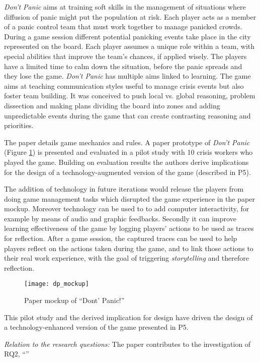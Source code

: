 \emph{Don't Panic} aims at training soft skills in the management of situations where diffusion of panic might put the population at risk. Each player acts as a member of a panic control team that must work together to manage panicked crowds. During a game session different potential panicking events take place in the city represented on the board. Each player assumes a unique role within a team, with special abilities that improve the team's chances, if applied wisely. The players have a limited time to calm down the situation, before the panic spreads and they lose the game. \emph{Don't Panic} has multiple aims linked to learning. The game aims at teaching communication styles useful to manage crisis events but also foster team building. It was conceived to push local vs. global reasoning, problem dissection and making plans dividing the board into zones and adding unpredictable events during the game that can create contrasting reasoning and priorities.

The paper details game mechanics and rules. A paper prototype of \emph{Don't Panic} (Figure \ref{fig:dp-mockup}) is presented and evaluated in a pilot study with 10 crisis workers who played the game. Building on evaluation results the authors derive implications for the design of a technology-augmented version of the game (described in P5).

The addition of technology in future iterations would release the players from doing game management tasks which disrupted the game experience in the paper mockup. Moreover technology can be used to to add computer interactivity, for example by means of audio and graphic feedbacks. Secondly it can improve learning effectiveness of the game by logging players' actions to be used as traces for reflection. After a game session, the captured traces can be used to help players reflect on the actions taken during the game, and to link those actions to their real work experience, with the goal of triggering \emph{storytelling} and therefore reflection. 

\begin{figure}
	[tbh] \centering 
	\texttt{[image: dp\_mockup]} \caption{Paper mockup of “Dont’ Panic!”} \label{fig:dp-mockup} 
\end{figure}

This pilot study and the derived implication for design have driven the design of a technology-enhanced version of the game presented in P5.

\emph{Relation to the research questions: } The paper contributes to the investigation of RQ2, ``\RQii''

